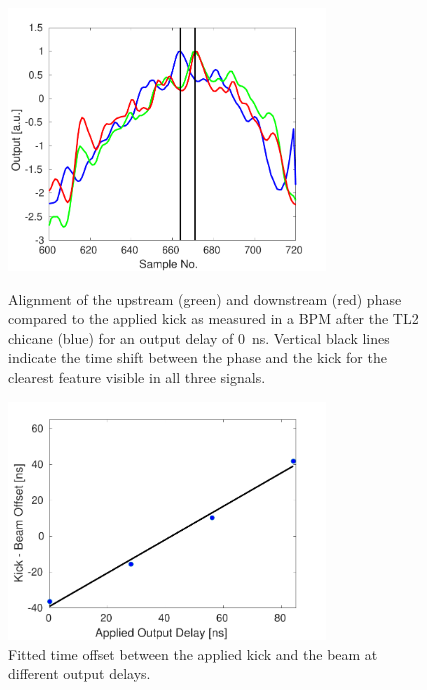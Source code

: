 \begin{figure}
  \centering
  \includegraphics[width=0.75\textwidth]{Figures/commissioning/absTimBeam_d0}
  \caption{Alignment of the upstream (green) and downstream (red) phase compared to the applied kick as measured in a BPM after the TL2 chicane (blue) for an output delay of 0~ns. Vertical black lines indicate the time shift between the phase and the kick for the clearest feature visible in all three signals.}
  \label{f:absTimBeam_d0}
  \includegraphics[width=0.75\textwidth]{Figures/commissioning/absTimBeam_fit}
  \caption{Fitted time offset between the applied kick and the beam at different output delays.}
  \label{f:absTimBeam_fit}
\end{figure}

